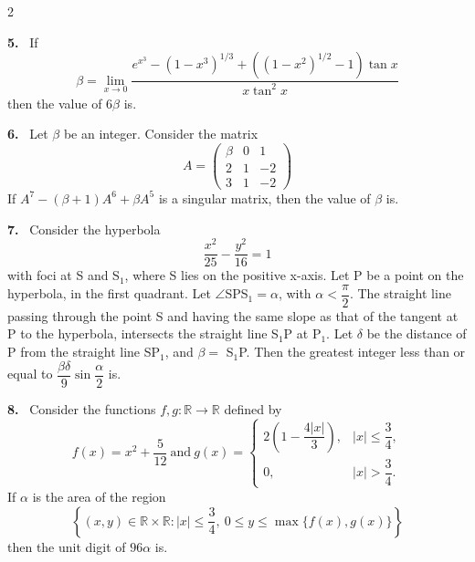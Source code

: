 \documentclass[10pt]{extarticle}
\newcommand{\qn}[1]{\par\smallskip\noindent\textbf{#1.}~}
\begin{document}
\begin{multicols}{2}
\qn{5} If
\[\beta = \lim_{x\to0} \dfrac{e^{x^3}-(1-x^3)^{1/3}+\left((1-x^2)^{1/2}-1\right)\tan x}{x\tan^2 x}\]
then the value of $6\beta$ is\underline{\hspace{2em}}.

\qn{6} Let $\beta$ be an integer. Consider the matrix
\[A = \begin{pmatrix}\beta & 0 & 1\\ 2 & 1 & -2\\ 3 & 1 & -2\end{pmatrix}\]
If $A^7-(\beta+1)A^6+\beta A^5$ is a singular matrix, then the value of $\beta$ is\underline{\hspace{2em}}.

\qn{7} Consider the hyperbola
\[\dfrac{x^2}{25}-\dfrac{y^2}{16}=1\]
with foci at S and S$_1$, where S lies on the positive x-axis. Let P be a point on the hyperbola, in the first quadrant. Let $\angle$SPS$_1=\alpha$, with $\alpha<\dfrac{\pi}{2}$. The straight line passing through the point S and having the same slope as that of the tangent at P to the hyperbola, intersects the straight line S$_1$P at P$_1$. Let $\delta$ be the distance of P from the straight line SP$_1$, and $\beta=$ S$_1$P. Then the greatest integer less than or equal to $\dfrac{\beta\delta}{9}\sin\dfrac{\alpha}{2}$ is\underline{\hspace{2em}}.

\qn{8} Consider the functions $f,g:\mathbb R\to\mathbb R$ defined by
\[f(x) = x^2+\dfrac{5}{12}\ \text{and}\ g(x) = \begin{cases}2\left(1-\dfrac{4|x|}{3}\right), & |x|\le\dfrac34,\\[4pt] 0, & |x|>\dfrac34.\end{cases}\]
If $\alpha$ is the area of the region
\[\left\{(x,y)\in\mathbb R\times\mathbb R : |x|\le\dfrac34,\ 0\le y\le\max\{f(x),g(x)\}\right\}\]
then the unit digit of $96\alpha$ is\underline{\hspace{2em}}.

\end{multicols}
\end{document}
